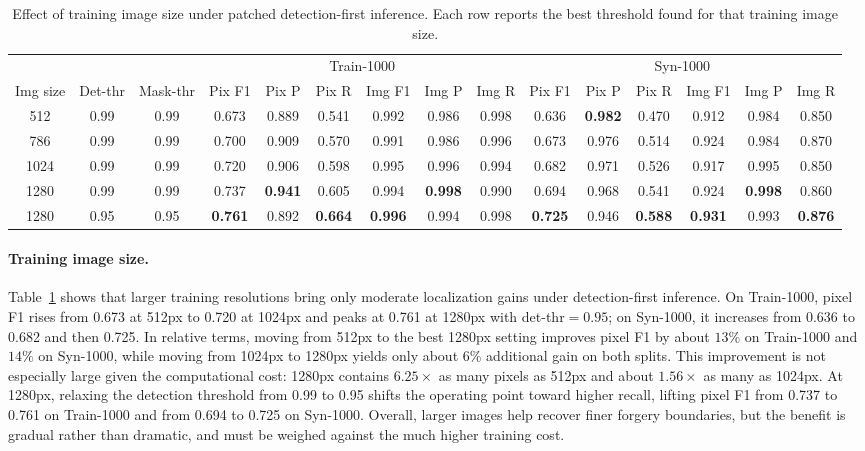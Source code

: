 \documentclass[sigconf, screen, review, anonymous]{acmart}
\begin{document}
\begin{table}[t]
    \caption{Effect of training image size under patched detection-first inference. Each row reports the best threshold found for that training image size.}
    \label{tab:imgsize_results}
    \centering
    \small
    \setlength{\tabcolsep}{3pt}
    \begin{tabular}{ccc|cccccc|cccccc}
        \toprule
        & & & \multicolumn{6}{c|}{Train-1000} & \multicolumn{6}{c}{Syn-1000} \\
        Img size & Det-thr & Mask-thr & Pix F1 & Pix P & Pix R & Img F1 & Img P & Img R & Pix F1 & Pix P & Pix R & Img F1 & Img P & Img R \\
        \midrule
        512 & 0.99 & 0.99 & 0.673 & 0.889 & 0.541 & 0.992 & 0.986 & 0.998 & 0.636 & \textbf{0.982} & 0.470 & 0.912 & 0.984 & 0.850 \\
        786 & 0.99 & 0.99 & 0.700 & 0.909 & 0.570 & 0.991 & 0.986 & 0.996 & 0.673 & 0.976 & 0.514 & 0.924 & 0.984 & 0.870 \\
        1024 & 0.99 & 0.99 & 0.720 & 0.906 & 0.598 & 0.995 & 0.996 & 0.994 & 0.682 & 0.971 & 0.526 & 0.917 & 0.995 & 0.850 \\
        1280 & 0.99 & 0.99 & 0.737 & \textbf{0.941} & 0.605 & 0.994 & \textbf{0.998} & 0.990 & 0.694 & 0.968 & 0.541 & 0.924 & \textbf{0.998} & 0.860 \\
        1280 & 0.95 & 0.95 & \textbf{0.761} & 0.892 & \textbf{0.664} & \textbf{0.996} & 0.994 & 0.998 & \textbf{0.725} & 0.946 & \textbf{0.588} & \textbf{0.931} & 0.993 & \textbf{0.876} \\
        \bottomrule
    \end{tabular}%
\end{table}

\paragraph{Training image size.} Table~\ref{tab:imgsize_results} shows that larger training resolutions bring only moderate localization gains under detection-first inference. On Train-1000, pixel F1 rises from 0.673 at 512px to 0.720 at 1024px and peaks at 0.761 at 1280px with det-thr$=0.95$; on Syn-1000, it increases from 0.636 to 0.682 and then 0.725. In relative terms, moving from 512px to the best 1280px setting improves pixel F1 by about $13\%$ on Train-1000 and $14\%$ on Syn-1000, while moving from 1024px to 1280px yields only about $6\%$ additional gain on both splits. This improvement is not especially large given the computational cost: 1280px contains $6.25\times$ as many pixels as 512px and about $1.56\times$ as many as 1024px. At 1280px, relaxing the detection threshold from 0.99 to 0.95 shifts the operating point toward higher recall, lifting pixel F1 from 0.737 to 0.761 on Train-1000 and from 0.694 to 0.725 on Syn-1000. Overall, larger images help recover finer forgery boundaries, but the benefit is gradual rather than dramatic, and must be weighed against the much higher training cost.
\end{document}

